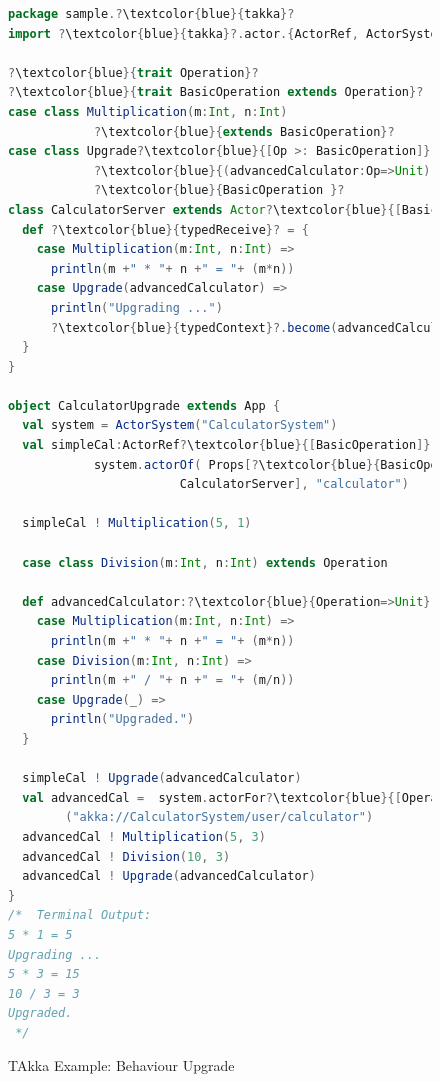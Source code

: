 \begin{figure}[!h]
\begin{lstlisting}[language=scala,  escapechar=?]
package sample.?\textcolor{blue}{takka}?
import ?\textcolor{blue}{takka}?.actor.{ActorRef, ActorSystem, Props, Actor}

?\textcolor{blue}{trait Operation}?
?\textcolor{blue}{trait BasicOperation extends Operation}?
case class Multiplication(m:Int, n:Int) 
			?\textcolor{blue}{extends BasicOperation}?
case class Upgrade?\textcolor{blue}{[Op >: BasicOperation]}?
			?\textcolor{blue}{(advancedCalculator:Op=>Unit) extends }?
			?\textcolor{blue}{BasicOperation }?
class CalculatorServer extends Actor?\textcolor{blue}{[BasicOperation]}? { 
  def ?\textcolor{blue}{typedReceive}? = {
    case Multiplication(m:Int, n:Int) => 
      println(m +" * "+ n +" = "+ (m*n))
    case Upgrade(advancedCalculator) =>
      println("Upgrading ...")
      ?\textcolor{blue}{typedContext}?.become(advancedCalculator)
  }
}

object CalculatorUpgrade extends App {
  val system = ActorSystem("CalculatorSystem") 
  val simpleCal:ActorRef?\textcolor{blue}{[BasicOperation]}? = 
  			system.actorOf( Props[?\textcolor{blue}{BasicOperation}?, 
						CalculatorServer], "calculator")
						
  simpleCal ! Multiplication(5, 1)
  
  case class Division(m:Int, n:Int) extends Operation
  
  def advancedCalculator:?\textcolor{blue}{Operation=>Unit}? = {
    case Multiplication(m:Int, n:Int) => 
      println(m +" * "+ n +" = "+ (m*n))
    case Division(m:Int, n:Int) => 
      println(m +" / "+ n +" = "+ (m/n))
    case Upgrade(_) =>
      println("Upgraded.")
  }
  
  simpleCal ! Upgrade(advancedCalculator)    
  val advancedCal =  system.actorFor?\textcolor{blue}{[Operation]}?
  		("akka://CalculatorSystem/user/calculator")   
  advancedCal ! Multiplication(5, 3)
  advancedCal ! Division(10, 3)
  advancedCal ! Upgrade(advancedCalculator)
}
/*  Terminal Output:
5 * 1 = 5
Upgrading ...
5 * 3 = 15
10 / 3 = 3
Upgraded.
 */
\end{lstlisting}
  \caption{TAkka Example: Behaviour Upgrade}
  \label{fig:takka_swap} 
  \vspace{-10pt }
\end{figure}






